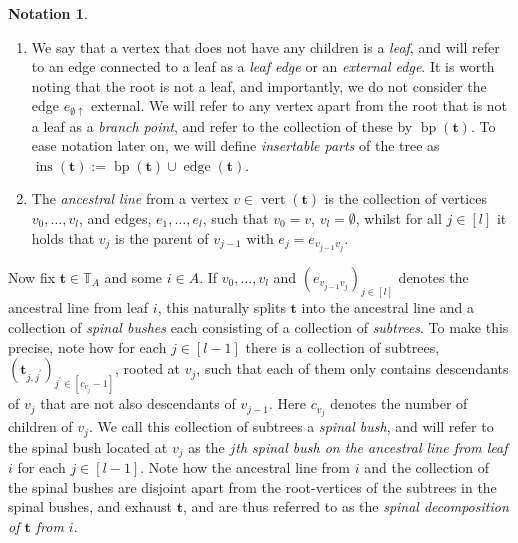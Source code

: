 \documentclass[a4paper, final]{amsart}
\theoremstyle{plain}
\theoremstyle{definition}
\newtheorem{nota}[thm]{Notation}
\newcommand{\tree}[1][t]{\boldsymbol{#1}}
\newcommand{\T}{\mathbb{T}}
\DeclareMathOperator{\edge}{edge}
\DeclareMathOperator{\vertices}{vert}
\DeclareMathOperator{\siblings}{sib}
\DeclareMathOperator{\insertable}{ins}
\DeclareMathOperator{\branchpoints}{bp}
\newcommand{\insertablef}[1][\tree]{\insertable({\tree[#1]})}
\begin{document}
\begin{nota}
\begin{enumerate}
    \item We say that a vertex that does not have any children is a \textit{leaf}, and will refer to an edge connected to a leaf as a \textit{leaf edge} or an \textit{external edge}.
      It is worth noting that the root is not a leaf, and importantly, we do not consider the edge $e_{\emptyset \uparrow}$ external.
      We will refer to any vertex apart from the root that is not a leaf as a \textit{branch point}, and refer to the collection of these by $\branchpoints (\tree)$.
      To ease notation later on, we will define \textit{insertable parts} of the tree as $\insertablef[t] := \branchpoints(\tree) \cup \edge(\tree)$.
    \item The \textit{ancestral line} from a vertex $v \in \vertices(\tree)$ is the collection of vertices $v_0, \ldots, v_l$, and edges, $e_1, \ldots, e_l$, such that $v_0 = v$, $v_l = \emptyset$, whilst for all $j \in [l]$ it holds that $v_j$ is the parent of $v_{j-1}$ with $e_{j} = e_{v_{j-1}v_j}$.
  \end{enumerate}
\end{nota}

Now fix $\tree \in \T_A$ and some $i \in A$.
If $v_0, \ldots, v_l$ and ${\left( e_{v_{j-1}v_j} \right)}_{j \in [l]}$ denotes the ancestral line from leaf $i$, this naturally splits $\tree$ into the ancestral line and a collection of \textit{spinal bushes} each consisting of a collection of \textit{subtrees}.
To make this precise, note how for each $j \in [l-1]$ there is a collection of subtrees, ${\left( \tree_{j,j^\prime} \right)}_{j^\prime \in [c_{v_j} - 1]}$, rooted at $v_j$, such that each of them only contains descendants of $v_j$ that are not also descendants of $v_{j-1}$.
Here $c_{v_j}$ denotes the number of children of $v_j$.
We call this collection of subtrees a \textit{spinal bush}, and will refer to the spinal bush located at $v_j$ as the \textit{$j$th spinal bush on the ancestral line from leaf $i$} for each $j \in [l-1]$.
Note how the ancestral line from $i$ and the collection of the spinal bushes are disjoint apart from the root-vertices of the subtrees in the spinal bushes, and exhaust $\tree$, and are thus referred to as the \textit{spinal decomposition of $\tree$ from $i$}.
\end{document}
